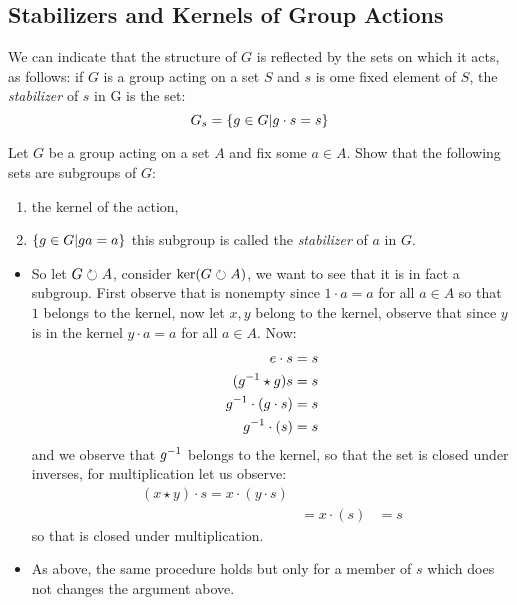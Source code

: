\subsection{Stabilizers and Kernels of Group Actions}
We can indicate that the structure of $ G $ is reflected by the sets on which it acts, as follows: if $ G $ is a group acting on a set $ S $ and $ s $ is ome fixed element of $ S $, the \emph{stabilizer} of $ s $ in G is the set:
\[ G_s = \left\lbrace g \in G | g \cdot s = s \right\rbrace \]

\begin{exc}
	Let $ G $ be a group acting on a set $ A $ and fix some $ a \in A $. Show that the following sets are subgroups of $ G $:
	\begin{enumerate}
		\item the kernel of the action,
		\item $ \left\lbrace g \in G | ga = a \right\rbrace $ this subgroup is called the \textit{stabilizer} of $ a $ in $ G $.
	\end{enumerate}
\end{exc}
\begin{sol}
	\begin{itemize}
		\item So let $ G \circlearrowright A $, consider $ \ker(G \circlearrowright A) $, we want to see that it is in fact a subgroup. First observe that is nonempty since $ 1 \cdot a = a  $ for all $ a \in A $ so that $ 1 $ belongs to the kernel, now let $ x,y $ belong to the kernel, observe that since $ y  $ is in the kernel $ y \cdot a = a $ for all $ a \in A $. Now:
		\begin{align*}
		e \cdot s = s \\
		(g^{-1} \star g) s = s \\
		g^{-1} \cdot (g\cdot s) = s \\
		g^{-1} \cdot (s) = s
		\end{align*}
		and we observe that $ g^{-1} $ belongs to the kernel, so that the set is closed under inverses, for multiplication let us observe:
		\begin{align*}
		(x \star y) \cdot s = x \cdot ( y \cdot s) \\
		&= x \cdot (s) 
		&= s
		\end{align*}
		so that is closed under multiplication.
		\item As above, the same procedure holds but only for a member of $ s $ which does not changes the argument above.
	\end{itemize}
	
\end{sol}

